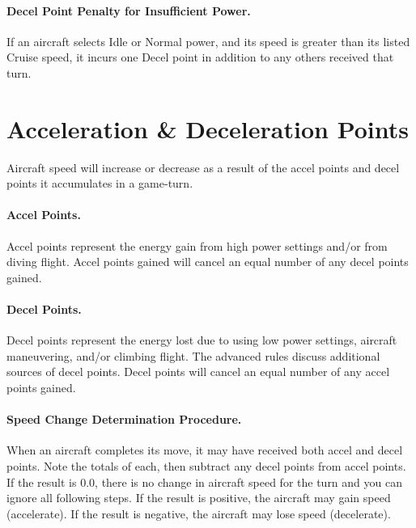 \paragraph{Decel Point Penalty for Insufficient Power.} If an aircraft selects Idle or Normal power, and its speed is greater than its listed Cruise speed, it incurs one Decel point in addition to any others received that turn.

\section{Acceleration \& Deceleration Points}


Aircraft speed will increase or decrease as a result of the accel points and decel points it accumulates in a game-turn. 

\paragraph{Accel Points.} Accel points represent the energy gain from high power settings and/or from diving flight. Accel points gained will cancel an equal number of any decel points gained.

\paragraph{Decel Points.} Decel points represent the energy lost due to using low power settings, aircraft maneuvering, and/or climbing flight. The advanced rules discuss additional sources of decel points. Decel points will cancel an equal number of any accel points gained.

\paragraph{Speed Change Determination Procedure.} When an aircraft completes its move, it may have received both accel and decel points. Note the totals of each, then subtract any decel points from accel points. If the result is 0.0, there is no change in aircraft speed for the turn and you can ignore all following steps. If the result is positive, the aircraft may gain speed (accelerate). If the result is negative, the aircraft may lose speed (decelerate).


